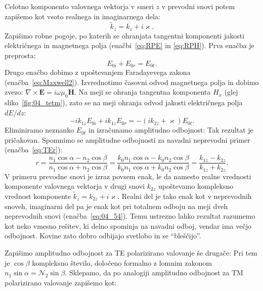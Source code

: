 Celotno komponento valovnega vektorja v smeri $z$ v prevodni snovi potem zapišemo kot vsoto 
realnega in imaginarnega dela:
\begin{equation}
\tilde{k}_z = k_z + i \varkappa.
\label{eq:04_95}
\end{equation}
Zapišimo robne pogoje, po katerih se ohranjata tangentni komponenti jakosti
električnega in magnetnega polja (enačbi~\ref{eq:RPE} in \ref{eq:RPH}). Prva enačba
je preprosta:
\begin{equation}
E_{0i} + E_{0r} = E_{0t}.
\label{eq:04_97}
\end{equation}
Drugo enačbo dobimo z upoštevanjem Faradayevega zakona (enačba~\ref{eq:Maxwell2}).
Izvrednotimo časovni odvod magnetnega polja in dobimo zvezo: $\nabla \times \mathbf{E}
= i \omega \mu_0 \mathbf{H}$. Na meji se ohranja tangentna komponenta $H_x$ (glej
sliko~\ref{fig:04_tetm}), zato
se na meji ohranja odvod jakosti električnega polja $dE/dz$:
\begin{equation}
-ik_{1z}E_{0i} + ik_{1z}E_{0r}= -(ik_{2z}+\varkappa)E_{0t}.
\label{eq:04_98}
\end{equation}
Eliminiramo neznanko $E_{0t}$ in izračunamo amplitudno odbojnost:
Tak rezultat je pričakovan. Spomnimo se amplitudne odbojnosti za navadni neprevodni primer
(enačba~\ref{eq:TEr}):
\begin{equation}
r = \frac{n_1 \cos \alpha - n_2 \cos \beta}{n_1 \cos \alpha + n_2 \cos \beta} = 
\frac{k_0 n_1 \cos \alpha - k_0 n_2 \cos \beta}{k_0 n_1 \cos \alpha + k_0 n_2 \cos \beta} = 
\frac{k_{1z}-k_{2z}}{k_{1z}+k_{2z}}.
\label{eq:04_96}
\end{equation}
V primeru prevodne snovi je izraz povsem enak, le da namesto
realne vrednosti komponente valovnega vektorja v drugi snovi $k_{2z}$ 
upoštevamo kompleksno vrednost komponente $\tilde{k}_z = k_{2z}+ i\varkappa$. Realni del 
je tako enak kot v neprevodnih snoveh, imaginarni del pa je enak kot pri totalnem odboju
na meji dveh neprevodnih snovi (enačba~\ref{eq:04_54}). 
Temu ustrezno lahko rezultat razumemo kot neko vmesno rešitev, ki delno spominja
na navadni odboj, vendar ima večjo odbojnost. Kovine zato dobro odbijajo svetlobo
in se ``bleščijo''. 
 
Zapišimo amplitudno odbojnost za TE polarizirano valovanje še drugače:
Pri tem je $\cos \beta$ kompleksno število, določeno formalno 
z lomnim zakonom $n_1 \sin \alpha = \mathcal{N}_2 \sin \beta$.
Sklepamo, da po analogiji amplitudno odbojnost za TM polarizirano valovanje zapišemo kot: 

